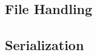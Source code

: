 \documentclass[14pt,fleqn]{extbook} %
\begin{document}
\subsection{File Handling}

\subsection{Serialization}




%
%
%
%
%
%
%
%
%
\end{document}

